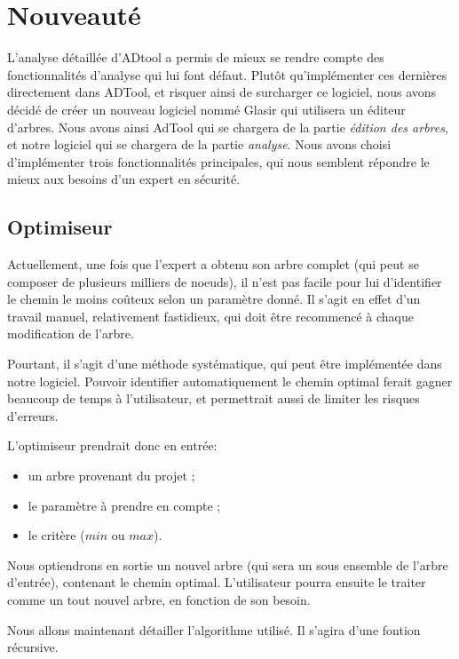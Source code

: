 \section{Nouveauté}
	
	L'analyse détaillée d'ADtool a permis de mieux se rendre compte des fonctionnalités d'analyse qui lui font défaut. Plutôt qu'implémenter ces dernières directement dans ADTool, et risquer ainsi de surcharger ce logiciel, nous avons décidé de créer un nouveau logiciel nommé Glasir qui utilisera un éditeur d'arbres. Nous avons ainsi AdTool qui se chargera de la partie \textit{édition des arbres}, et notre logiciel qui se chargera de la partie \textit{analyse}. Nous avons choisi d'implémenter trois fonctionnalités principales, qui nous semblent répondre le mieux aux besoins d'un expert en sécurité.

	\subsection{Optimiseur}
		
		Actuellement, une fois que l'expert a obtenu son arbre complet (qui peut se composer de plusieurs milliers de noeuds), il n'est pas facile pour lui d'identifier le chemin le moins coûteux selon un paramètre donné. Il s'agit en effet d'un travail manuel, relativement fastidieux, qui doit être recommencé à chaque modification de l'arbre.
		
		Pourtant, il s'agit d'une méthode systématique, qui peut être implémentée dans notre logiciel. Pouvoir identifier automatiquement le chemin optimal ferait gagner beaucoup de temps à l'utilisateur, et permettrait aussi de limiter les risques d'erreurs.
		
		L'optimiseur prendrait donc en entrée:
		\begin{itemize}
			\item un arbre provenant du projet ;
			\item le paramètre à prendre en compte ;
			\item le critère ($min$ ou $max$).
		\end{itemize}
		
		Nous optiendrons en sortie un nouvel arbre (qui sera un sous ensemble de l'arbre d'entrée), contenant le chemin optimal. 
		L'utilisateur pourra ensuite le traiter comme un tout nouvel arbre, en fonction de son besoin.
		
		Nous allons maintenant détailler l'algorithme utilisé. Il s'agira d'une fontion récursive.

